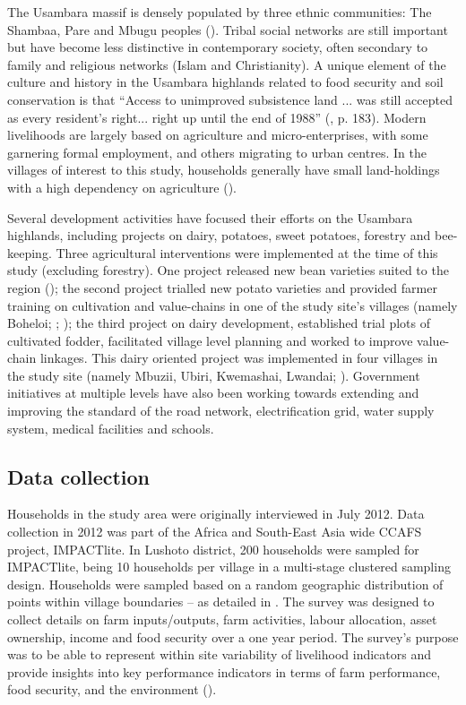 The Usambara massif is densely populated by three ethnic communities: The Shambaa, Pare and Mbugu peoples (\citealp{Lyamchai2011}). Tribal social networks are still important but have become less distinctive in contemporary society, often secondary to family and religious networks (Islam and Christianity). A unique element of the culture and history in the Usambara highlands related to food security and soil conservation is that ``Access to unimproved subsistence land ... was still accepted as every resident's right... right up until the end of 1988'' (\citealp{Feierman1990}, p. 183). Modern livelihoods are largely based on agriculture and micro-enterprises, with some garnering formal employment, and others migrating to urban centres. In the villages of interest to this study, households generally have small land-holdings with a high dependency on agriculture (\citealp{Lyamchai2011}).

Several development activities have focused their efforts on the Usambara highlands, including projects on dairy, potatoes, sweet potatoes, forestry and bee-keeping. Three agricultural interventions were implemented at the time of this study (excluding forestry). One project released new bean varieties suited to the region (\citealp{Kimeli2014}); the second project trialled new potato varieties and provided farmer training on cultivation and value-chains in one of the study site's villages (namely Boheloi; \citealp{Harahagazwe2016}; \citealp{Harahagazwe2014}); the third project on dairy development, established trial plots of cultivated fodder, facilitated village level planning and worked to improve value-chain linkages. This dairy oriented project was implemented in four villages in the study site (namely Mbuzii, Ubiri, Kwemashai, Lwandai; \citealp{Kilelu20171102}). Government initiatives at multiple levels have also been working towards extending and improving the standard of the road network, electrification grid, water supply system, medical facilities and schools.

\subsection{Data collection}

Households in the study area were originally interviewed in July 2012. Data collection in 2012 was part of the Africa and South-East Asia wide CCAFS project, IMPACTlite. In Lushoto district, 200 households were sampled for IMPACTlite, being 10 households per village in a multi-stage clustered sampling design. Households were sampled based on a random geographic distribution of points within village boundaries -- as detailed in \citet{Rufino2013}. The survey was designed to collect details on farm inputs/outputs, farm activities, labour allocation, asset ownership, income and food security over a one year period. The survey's purpose was to be able to represent within site variability of livelihood indicators and provide insights into key performance indicators in terms of farm performance, food security, and the environment (\citealp{Rufino2013}).

